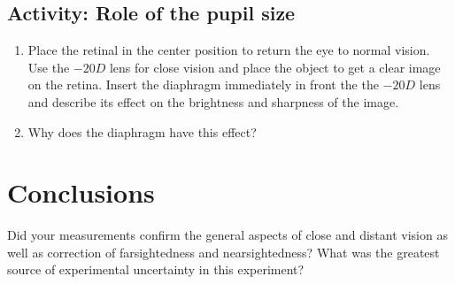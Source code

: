\subsection{Activity: Role of the pupil size}
\begin{enumerate}
	 \item Place the retinal in the center position to return the eye to normal vision. Use the $-20 D$ lens for close vision and place the object to get a clear image on the retina. Insert the diaphragm immediately in front the the $-20 D$ lens and describe its effect on the brightness and sharpness of the image.
	 \item Why does the diaphragm have this effect?
\end{enumerate}

\section{Conclusions} Did your measurements confirm the general aspects of close and distant vision as well as correction of farsightedness and nearsightedness? What was the greatest source of experimental uncertainty in this experiment?

 
\endinput
